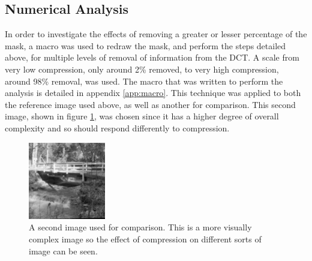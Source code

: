 	\subsection{Numerical Analysis} %
		\label{sub:numerical_analysis}
		In order to investigate the effects of removing a greater or lesser percentage of the mask, a macro was used to redraw the mask, and perform the steps detailed above, for multiple levels of removal of information from the DCT. A scale from very low compression, only around 2\% removed, to very high compression, around 98\% removal, was used. The macro that was written to perform the analysis is detailed in appendix \ref{app:macro}. This technique was applied to both the reference image used above, as well as another for comparison. This second image, shown in figure \ref{fig:bridge_original}, was chosen since it has a higher degree of overall complexity and so should respond differently to compression.
		\begin{figure}[ht]
			\centering
			\includegraphics[width=0.3\textwidth]{bridge.png}
			\caption{A second image used for comparison. This is a more visually complex image so the effect of compression on different sorts of image can be seen.\label{fig:bridge_original}}
		\end{figure}

